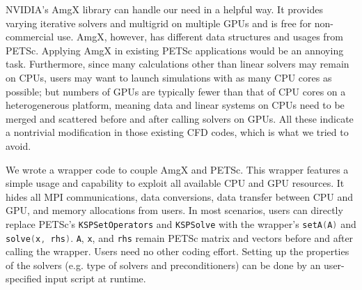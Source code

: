 NVIDIA's AmgX library can handle our need in a helpful way.
It provides varying iterative solvers and multigrid on multiple GPUs and is free for non-commercial use.
AmgX, however, has different data structures and usages from PETSc.
Applying AmgX in existing PETSc applications would be an annoying task.
Furthermore, 
since many calculations other than linear solvers may remain on CPUs,
users may want to launch simulations with as many CPU cores as possible;
but numbers of GPUs are typically fewer than that of CPU cores on a heterogenerous platform,
meaning data and linear systems on CPUs need to be merged and scattered
before and after calling solvers on GPUs.
All these indicate a nontrivial modification in those existing CFD codes, 
which is what we tried to avoid.

We wrote a wrapper code to couple AmgX and PETSc. 
This wrapper features a simple usage and capability to exploit all available CPU and GPU resources.
It hides all MPI communications, data conversions, data transfer between CPU and GPU, and memory allocations from users.
In most scenarios,
users can directly replace PETSc's
\lstinline[language=C++, basicstyle=\ttfamily]|KSPSetOperators| and 
\lstinline[language=C++, basicstyle=\ttfamily]|KSPSolve| 
with the wrapper's
\lstinline[language=C++, basicstyle=\ttfamily]|setA(A)| and
\lstinline[language=C++, basicstyle=\ttfamily]|solve(x, rhs)|.
\lstinline[language=C++, basicstyle=\ttfamily]|A|,
\lstinline[language=C++, basicstyle=\ttfamily]|x|, and
\lstinline[language=C++, basicstyle=\ttfamily]|rhs|
remain PETSc matrix and vectors before and after calling the wrapper.
Users need no other coding effort.
Setting up the properties of the solvers (e.g. type of solvers and preconditioners) can be done by an user-specified input script at runtime.

